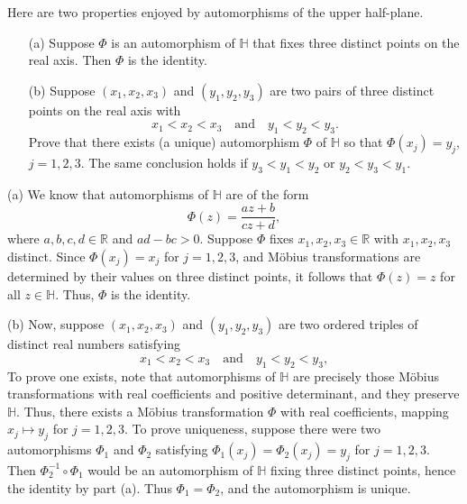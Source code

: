 \documentclass[12pt]{article}
\begin{document}
\begin{statement}[8.5.15]
    Here are two properties enjoyed by automorphisms of the upper half-plane.
    \begin{itemize}
        \item[(a)] Suppose $\Phi$ is an automorphism of $\mathbb{H}$ that fixes three distinct points on the real axis. Then $\Phi$ is the identity.

        \item[(b)] Suppose $(x_1, x_2, x_3)$ and $(y_1, y_2, y_3)$ are two pairs of three distinct points on the real axis with
        $$ x_1 < x_2 < x_3 \quad \text{and} \quad y_1 < y_2 < y_3. $$
        Prove that there exists (a unique) automorphism $\Phi$ of $\mathbb{H}$ so that $\Phi(x_j) = y_j$, $j = 1,2,3$. The same conclusion holds if $y_3 < y_1 < y_2$ or $y_2 < y_3 < y_1$.
    \end{itemize}
\end{statement}
\begin{newproof}
    (a) We know that automorphisms of $\mathbb{H}$ are of the form
    $$ \Phi(z) = \frac{az + b}{cz + d}, $$
    where $a,b,c,d \in \mathbb{R}$ and $ad - bc > 0$. Suppose $\Phi$ fixes $x_1,x_2,x_3 \in \mathbb{R}$ with $x_1,x_2,x_3$ distinct. Since $\Phi(x_j) = x_j$ for $j = 1,2,3$, and Möbius transformations are determined by their values on three distinct points, it follows that $\Phi(z) = z$ for all $z \in \mathbb{H}$. Thus, $\Phi$ is the identity.

    (b) Now, suppose $(x_1, x_2, x_3)$ and $(y_1, y_2, y_3)$ are two ordered triples of distinct real numbers satisfying
    $$ x_1 < x_2 < x_3 \quad \text{and} \quad y_1 < y_2 < y_3, $$
    To prove one exists, note that automorphisms of $\mathbb{H}$ are precisely those Möbius transformations with real coefficients and positive determinant, and they preserve $\mathbb{H}$. Thus, there exists a Möbius transformation $\Phi$ with real coefficients, mapping $x_j \mapsto y_j$ for $j=1,2,3$. To prove uniqueness, suppose there were two automorphisms $\Phi_1$ and $\Phi_2$ satisfying $\Phi_1(x_j) = \Phi_2(x_j) = y_j$ for $j=1,2,3$. Then $\Phi_2^{-1} \circ \Phi_1$ would be an automorphism of $\mathbb{H}$ fixing three distinct points, hence the identity by part (a). Thus $\Phi_1 = \Phi_2$, and the automorphism is unique.
\end{newproof}

\begin{statement}[8.5.16]
\end{statement}
\end{document}
